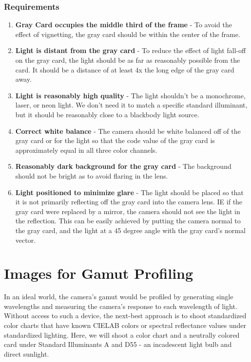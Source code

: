 \documentclass[twoside]{article}
\begin{document}
\subsubsection{Requirements}
\begin{enumerate}
    \item \textbf{Gray Card occupies the middle third of the frame} - To avoid the effect of vignetting, the gray card should be within the center of the frame.
    \item \textbf{Light is distant from the gray card} - To reduce the effect of light fall-off on the gray card, the light should be as far as reasonably possible from the card. It should be a distance of at least 4x the long edge of the gray card away.
    \item \textbf{Light is reasonably high quality} - The light shouldn't be a monochrome, laser, or neon light. We don't need it to match a specific standard illuminant, but it should be reasonably close to a blackbody light source.
    \item \textbf{Correct white balance} - The camera should be white balanced off of the gray card or for the light so that the code value of the gray card is approximately equal in all three color channels.
    \item \textbf{Reasonably dark background for the gray card} - The background should not be bright as to avoid flaring in the lens.
    \item \textbf{Light positioned to minimize glare} - The light should be placed so that it is not primarily reflecting off the gray card into the camera lens. IE if the gray card were replaced by a mirror, the camera should not see the light in the reflection. This can be easily achieved by putting the camera normal to the gray card, and the light at a 45 degree angle with the gray card's normal vector.
\end{enumerate}

\newpage
\section{Images for Gamut Profiling}
In an ideal world, the camera's gamut would be profiled by generating single wavelengths and measuring the camera's response to each wavelength of light. Without access to such a device, the next-best approach is to shoot standardized color charts that have known CIELAB colors or spectral reflectance values under standardized lighting. Here, we will shoot a color chart and a neutrally colored card under Standard Illuminants A and D55 - an incadescent light bulb and direct sunlight.
\end{document}
